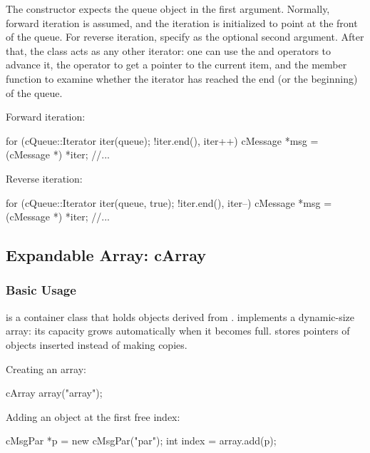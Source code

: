 The  constructor expects the queue object in the
first argument. Normally, forward iteration is assumed, and the iteration
is initialized to point at the front of the queue. For reverse iteration,
specify  as the optional second argument. After that, the
class acts as any other {\opp} iterator: one can use the \ttt{++} and
\ttt{--} operators to advance it, the \ttt{*} operator to get a pointer
to the current item, and the  member function to examine
whether the iterator has reached the end (or the beginning) of the queue.

Forward iteration:

\begin{cpp}
for (cQueue::Iterator iter(queue); !iter.end(), iter++) {
    cMessage *msg = (cMessage *) *iter;
    //...
}
\end{cpp}

Reverse iteration:

\begin{cpp}
for (cQueue::Iterator iter(queue, true); !iter.end(), iter--) {
    cMessage *msg = (cMessage *) *iter;
    //...
}
\end{cpp}



\subsection{Expandable Array: cArray}
\label{sec:sim-lib:carray}

\subsubsection{Basic Usage}
\label{sec:sim-lib:carray-basic-usage}

 is a container class that holds objects derived from
.  implements a dynamic-size array: its
capacity grows automatically when it becomes full.  stores
pointers of objects inserted instead of making copies.

Creating an array:

\begin{cpp}
cArray array("array");
\end{cpp}

Adding an object at the first free index:

\begin{cpp}
cMsgPar *p = new cMsgPar("par");
int index = array.add(p);
\end{cpp}

